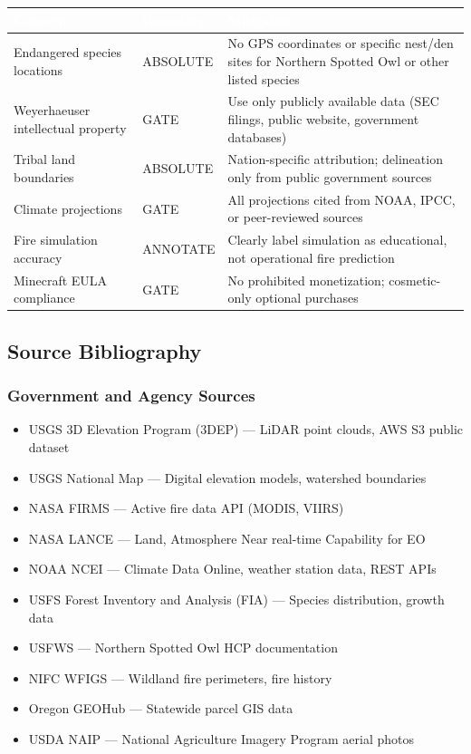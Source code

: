 \documentclass[11pt,letterpaper]{article}
\newcommand{\tableheader}[1]{\textbf{\sffamily\textcolor{white}{#1}}}
\begin{document}
\begin{center}
\begin{tabularx}{\textwidth}{L{3.5cm}L{3cm}X}
\toprule
{}
\tableheader{Concern} & \tableheader{Boundary} & \tableheader{Mitigation} \\
\midrule
Endangered species locations & ABSOLUTE & No GPS coordinates or specific nest/den sites for Northern Spotted Owl or other listed species \\
Weyerhaeuser intellectual property & GATE & Use only publicly available data (SEC filings, public website, government databases) \\
Tribal land boundaries & ABSOLUTE & Nation-specific attribution; delineation only from public government sources \\
Climate projections & GATE & All projections cited from NOAA, IPCC, or peer-reviewed sources \\
Fire simulation accuracy & ANNOTATE & Clearly label simulation as educational, not operational fire prediction \\
Minecraft EULA compliance & GATE & No prohibited monetization; cosmetic-only optional purchases \\
\bottomrule
\end{tabularx}
\end{center}

\subsection{Source Bibliography}

\subsubsection*{Government and Agency Sources}
\begin{itemize}[nosep]
  \item USGS 3D Elevation Program (3DEP) --- LiDAR point clouds, AWS S3 public dataset
  \item USGS National Map --- Digital elevation models, watershed boundaries
  \item NASA FIRMS --- Active fire data API (MODIS, VIIRS)
  \item NASA LANCE --- Land, Atmosphere Near real-time Capability for EO
  \item NOAA NCEI --- Climate Data Online, weather station data, REST APIs
  \item USFS Forest Inventory and Analysis (FIA) --- Species distribution, growth data
  \item USFWS --- Northern Spotted Owl HCP documentation
  \item NIFC WFIGS --- Wildland fire perimeters, fire history
  \item Oregon GEOHub --- Statewide parcel GIS data
  \item USDA NAIP --- National Agriculture Imagery Program aerial photos
\end{itemize}
\end{document}

